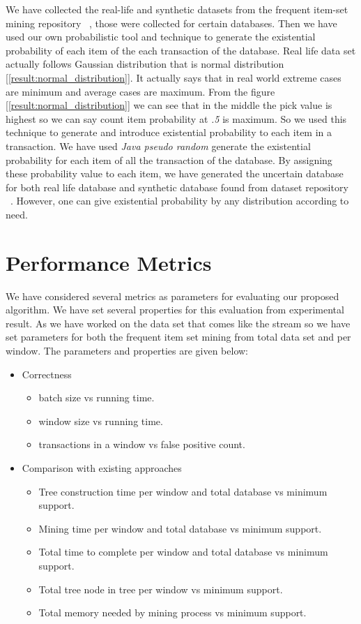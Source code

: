 
We have collected the real-life and synthetic datasets from the frequent item-set mining repository ~\cite{dataset}, those were collected for certain databases. Then we have used our own probabilistic tool and technique to generate the existential probability of each item of the each transaction of the database. Real life data set actually follows Gaussian distribution that is normal distribution [\ref{result:normal_distribution}]. It actually says that in real world extreme cases are minimum and average cases are maximum. From the figure [\ref{result:normal_distribution}] we can see that in the middle the pick value is highest so we can say count item probability at \emph{.5} is maximum. So we used this technique to generate and introduce existential probability to each item in a transaction. We have used \emph{Java pseudo random} generate the existential probability for each item of all the transaction of the database. By assigning these probability value to each item, we have generated the uncertain database for both real life database and synthetic database found from dataset repository ~\cite{dataset}. However, one can give existential probability by any distribution according to need.


\section{Performance Metrics}
We have considered several metrics as parameters for evaluating our proposed algorithm. We have set several properties for this evaluation from experimental result. As we have worked on the data set that comes like the stream so we have set parameters for both the frequent item set mining from total data set and per window. The parameters and properties are given below:

\begin{itemize}
    \item {Correctness}
    \begin{itemize}
        \item batch size vs running time.
        \item window size vs running time.
        \item transactions in a window vs false positive count.
    \end{itemize}
    \item {Comparison with existing approaches}
    \begin{itemize}
        \item Tree construction time per window and total database vs minimum support.
        \item Mining time per window and total database vs minimum support.
        \item Total time to complete per window and total database vs minimum support.
        \item Total tree node in tree per window vs minimum support.
        \item Total memory needed by mining process vs minimum support.
    \end{itemize}
\end{itemize}
